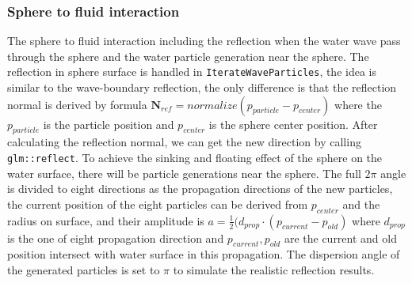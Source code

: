 \documentclass[acmtog]{acmart}
\begin{document}
\subsubsection{Sphere to fluid interaction}
The sphere to fluid interaction including the reflection when the water wave pass through the sphere and the water particle generation near the sphere. The reflection in sphere surface is handled in \verb|IterateWaveParticles|, the idea is similar to the wave-boundary reflection, the only difference is that the reflection normal is derived by formula $\mathbf{N}_{ref} = normalize(p_{particle} - p_{center})$ where the $p_{particle}$ is the particle position and $p_{center}$ is the sphere center position. After calculating the reflection normal, we can get the new direction by calling \verb|glm::reflect|.
To achieve the sinking and floating effect of the sphere on the water surface, there will be particle generations near the sphere. The full $2\pi$ angle is divided to eight directions as the propagation directions of the new particles, the current position of the eight particles can be derived from $p_{center}$ and the radius on surface, and their amplitude is $a = \frac{1}{2} (d_{prop}\cdot (p_{current}-p_{old})$ where $d_{prop}$ is the one of eight propagation direction and $p_{current},p_{old}$ are the current and old position intersect with water surface in this propagation. The dispersion angle of the generated particles is set to $\pi$ to simulate the realistic reflection results.
\end{document}
